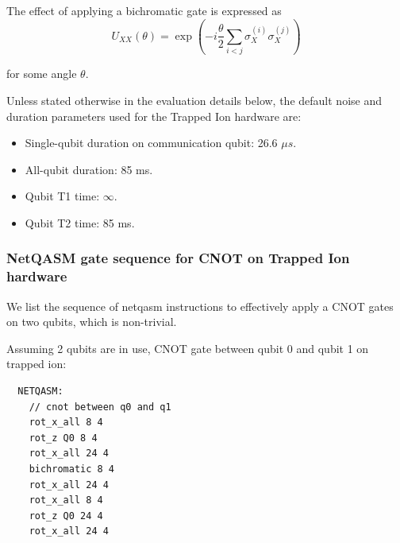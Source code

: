 The effect of applying a bichromatic gate is expressed as
\[
   U_{XX}(\theta) = \exp(-i \frac{\theta}{2} \sum_{i<j} \sigma_X^{(i)} \sigma_X^{(j)})
\]

for some angle $\theta$.

Unless stated otherwise in the evaluation details below, the default noise and duration parameters used for the Trapped Ion hardware are:
\begin{itemize}
  \item Single-qubit duration on communication qubit: 26.6 $\mu s$.
  \item All-qubit duration: 85 ms.
  \item Qubit T1 time: $\infty$.
  \item Qubit T2 time: 85 ms.
\end{itemize}

\subsubsection{NetQASM gate sequence for CNOT on Trapped Ion hardware}
We list the sequence of netqasm instructions to effectively apply a CNOT gates on two qubits, which is non-trivial.

Assuming 2 qubits are in use, CNOT gate between qubit 0 and qubit 1 on trapped ion:
\begin{lstlisting}
  NETQASM:
    // cnot between q0 and q1
    rot_x_all 8 4
    rot_z Q0 8 4
    rot_x_all 24 4
    bichromatic 8 4
    rot_x_all 24 4
    rot_x_all 8 4
    rot_z Q0 24 4
    rot_x_all 24 4
\end{lstlisting}

